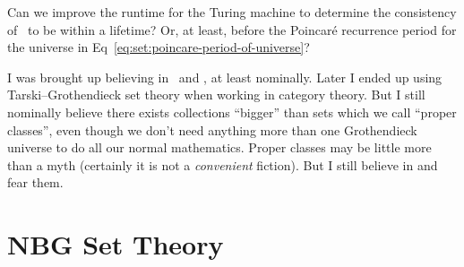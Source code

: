 \begin{puzzle}
Can we improve the runtime for the Turing machine to determine the
consistency of \ZFC\ to be within a lifetime? Or, at least, before the
Poincar\'e recurrence period for the universe in Eq~\eqref{eq:set:poincare-period-of-universe}?
\end{puzzle}

\begin{node}[Classes]\label{set-0003}%
I was brought up believing in \ZFC\ and \NBG, at least nominally. Later
I ended up using Tarski--Grothendieck set theory when working in
category theory. But I still nominally believe there exists collections
``bigger'' than sets which we call ``proper classes'', even though we
don't need anything more than one Grothendieck universe to do all our
normal mathematics. Proper classes may be little more than a myth
(certainly it is not a \emph{convenient} fiction). But I still believe in
and fear them.
\end{node}

\section{NBG Set Theory}\label{sec:set:nbg}

